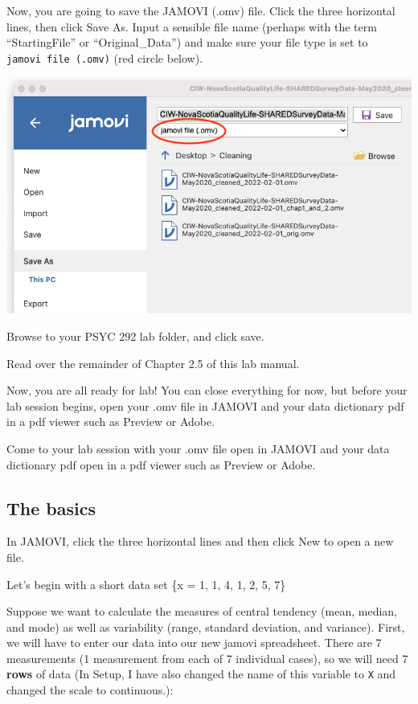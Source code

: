 \documentclass[
]{book}
\begin{document}
Now, you are going to save the JAMOVI (.omv) file. Click the three horizontal lines, then click {Save As}. Input a sensible file name (perhaps with the term ``StartingFile'' or ``Original\_Data'') and make sure your file type is set to \texttt{jamovi\ file\ (.omv)} (red circle below).

\includegraphics{img/saveasjamovi.png}

Browse to your PSYC 292 lab folder, and click save.

Read over the remainder of Chapter 2.5 of this lab manual.

Now, you are all ready for lab! You can close everything for now, but before your lab session begins, open your .omv file in JAMOVI and your data dictionary pdf in a pdf viewer such as Preview or Adobe.

Come to your lab session with your .omv file open in JAMOVI and your data dictionary pdf open in a pdf viewer such as Preview or Adobe.

\hypertarget{the-basics}{%
\subsection{The basics}\label{the-basics}}

In JAMOVI, click the three horizontal lines and then click {New} to open a new file.

Let's begin with a short data set \{x = 1, 1, 4, 1, 2, 5, 7\}

Suppose we want to calculate the measures of central tendency (mean, median, and mode) as well as variability (range, standard deviation, and variance). First, we will have to enter our data into our new jamovi spreadsheet. There are 7 measurements (1 measurement from each of 7 individual cases), so we will need 7 \textbf{rows} of data (In {Setup}, I have also changed the name of this variable to \texttt{X} and changed the scale to continuous.):
\end{document}
